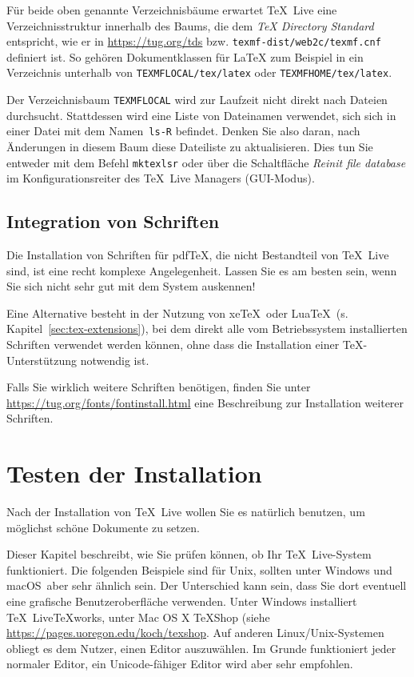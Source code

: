 \documentclass[12pt,ngerman,a4paper,fullparskip]{report}
\newcommand{\TL}{\TeX\ Live\xspace}
\newcommand{\cmdname}[1]{\texttt{#1}}
\newcommand{\filename}[1]{\texttt{#1}}
\newcommand{\dirname}[1]{\texttt{#1}}
\providecommand*{\macOS}{macOS\xspace}
\providecommand*{\XeTeX}{xe\TeX\xspace}
\begin{document}
Für beide oben genannte Verzeichnisbäume erwartet \TL eine Verzeichnisstruktur innerhalb des Baums, die dem \emph{\TeX{} Directory Standard} entspricht, wie er in \url{https://tug.org/tds} bzw. \filename{texmf-dist/web2c/texmf.cnf} definiert ist.
So gehören Dokumentklassen für \LaTeX{} zum Beispiel in ein Verzeichnis
unterhalb von \dirname{TEXMFLOCAL/tex/latex} oder \dirname{TEXMFHOME/tex/latex}.

Der Verzeichnisbaum \dirname{TEXMFLOCAL} wird zur Laufzeit nicht direkt nach Dateien durchsucht. Stattdessen wird eine Liste von Dateinamen verwendet, sich sich in einer Datei mit dem Namen~\filename{ls-R} befindet. Denken Sie also daran, nach Änderungen in diesem Baum diese Dateiliste zu aktualisieren. Dies tun Sie
entweder mit dem Befehl \cmdname{mktexlsr} oder über die Schaltfläche \emph{Reinit file database} im Kon\-fi\-gu\-rations\-reiter des \TeX\ Live Managers (GUI-Modus).

\subsection{Integration von Schriften}

Die Installation von Schriften für pdf\TeX, die nicht Bestandteil von \TL sind, ist eine recht komplexe Angelegenheit. Lassen Sie es am besten sein, wenn Sie sich nicht sehr gut mit dem System auskennen! %

Eine Alternative besteht in der Nutzung von \XeTeX\ oder Lua\TeX\ (s.\,Kapitel~\ref{sec:tex-extensions}), bei dem direkt alle vom Betriebssystem installierten Schriften verwendet werden können, ohne dass die Installation einer \TeX-Unterstützung notwendig ist.

Falls Sie wirklich weitere Schriften benötigen, finden Sie unter \url{https://tug.org/fonts/fontinstall.html} eine Beschreibung zur
Installation weiterer Schriften.

\section{Testen der Installation}
\label{sec:test-install}


Nach der Installation von \TL wollen Sie es natürlich benutzen, um möglichst schöne Dokumente zu setzen.

Dieser Kapitel beschreibt, wie Sie prüfen können, ob Ihr \TL-System funktioniert.
Die folgenden Beispiele sind für Unix, sollten unter Windows und \macOS\ aber sehr ähnlich sein. Der Unterschied kann sein, dass Sie dort eventuell eine grafische Benutzeroberfläche verwenden. 
Unter Windows installiert \TL \TeX works, unter Mac OS X \TeX Shop (siehe \url{https://pages.uoregon.edu/koch/texshop}.  Auf anderen Linux/Unix-Systemen obliegt es dem Nutzer, einen Editor auszuwählen. 
Im Grunde funktioniert jeder normaler Editor, ein Unicode-fähiger Editor wird aber sehr empfohlen.
\end{document}
